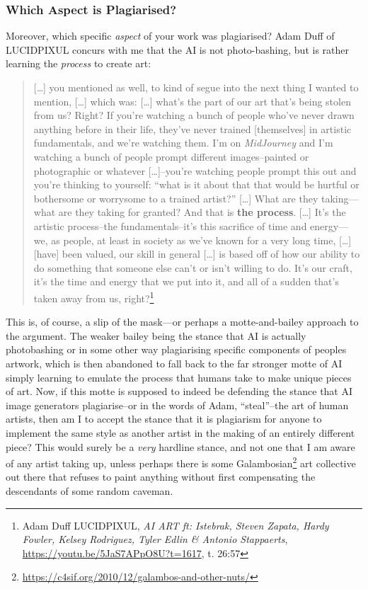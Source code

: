 \documentclass[11pt]{article}
\begin{document}
\subsubsection*{Which Aspect is Plagiarised?}
\label{sec:orgff7ce3f}
Moreover, which specific \emph{aspect} of your work was plagiarised? Adam Duff of LUCIDPIXUL concurs with me that the AI is not photo-bashing, but is rather learning the \emph{process} to create art:
\begin{quote}
[\ldots{}] you mentioned as well, to kind of segue into the next thing I wanted to mention, [\ldots{}] which was: [\ldots{}] what's the part of our art that's being stolen from us? Right? If you're watching a bunch of people who've never drawn anything before in their life, they've never trained [themselves] in artistic fundamentals, and we're watching them. I'm on \emph{MidJourney} and I'm watching a bunch of people prompt different images--painted or photographic or whatever [\ldots{}]--you're watching people prompt this out and you're thinking to yourself: ``what is it about that that would be hurtful or bothersome or worrysome to a trained artist?'' [\ldots{}] What are they taking---what are they taking for granted? And that is \textbf{the process}. [\ldots{}] It's the artistic process--the fundamentals--it's this sacrifice of time and energy---we, as people, at least in society as we've known for a very long time, [\ldots{}] [have] been valued, our skill in general [\ldots{}] is based off of how our ability to do something that someone else can't or isn't willing to do. It's our craft, it's the time and energy that we put into it, and all of a sudden that's taken away from us, right?\footnote{Adam Duff LUCIDPIXUL, \emph{AI ART ft: Istebrak, Steven Zapata, Hardy Fowler, Kelsey Rodriguez, Tyler Edlin \& Antonio Stappaerts}, \url{https://youtu.be/5JaS7APpO8U?t=1617}, t. 26:57}
\end{quote}

This is, of course, a slip of the mask---or perhaps a motte-and-bailey approach to the argument. The weaker bailey being the stance that AI is actually photobashing or in some other way plagiarising specific components of peoples artwork, which is then abandoned to fall back to the far stronger motte of AI simply learning to emulate the process that humans take to make unique pieces of art. Now, if this motte is supposed to indeed be defending the stance that AI image generators plagiarise--or in the words of Adam, ``steal''--the art of human artists, then am I to accept the stance that it is plagiarism for anyone to implement the same style as another artist in the making of an entirely different piece? This would surely be a \emph{very} hardline stance, and not one that I am aware of any artist taking up, unless perhaps there is some Galambosian\footnote{\url{https://c4sif.org/2010/12/galambos-and-other-nuts/}} art collective out there that refuses to paint anything without first compensating the descendants of some random caveman.
\end{document}
